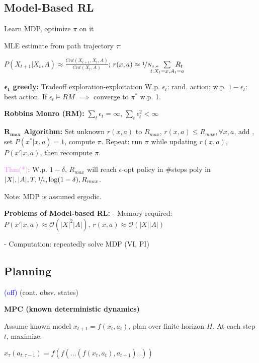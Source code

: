 \subsection*{Model-Based RL} {\fontsize{9.5}{6}\selectfont Learn MDP, optimize $\pi$ on it}

MLE estimate from path trajectory $\tau$:

{\fontsize{9.7}{6}\selectfont $P(X_{t+1} | X_t, A) \approx \frac{Cnt(X_{t+1}, X_t, A)}{Cnt(X_t, A)}$;
$r(x,a) \approx \nicefrac{1}{N_{x,a}} \hspace*{-5mm} \sum\limits_{t: X_t = x, A_t = a} \hspace*{-5mm} R_t$}

\textbf{$\mathbf{\epsilon_t}$ greedy:} Tradeoff exploration-exploitation
W.p. $\epsilon_t$: rand. action; w.p. $1 - \epsilon_t$: best action.
If $\epsilon_t \vDash RM$ $\implies$ converge to $\pi^*$ w.p. 1.

\textbf{Robbins Monro (RM):} $\sum_t \epsilon_t = \infty$, $\sum_t \epsilon_t^2 < \infty$

\textbf{$\mathbf{R_{max}}$ Algorithm:} Set unknown $r(x,a)$ to $R_{max}$, $r(x,a) \leq R_{max}, \forall x,a$, add , set $P(x^* | x,a) = 1$, compute $\pi$. Repeat: run $\pi$ while updating $r(x,a)$, $P(x' | x,a)$, then recompute $\pi$.

\textcolor{violet}{Thm(*)}: W.p. $1 - \delta$, $R_{max}$ will reach $\epsilon$-opt policy in \#steps poly in $|X|, |A|, T, \nicefrac{1}{\epsilon}, \log(1 - \delta), R_{max}$.

Note: MDP is assumed ergodic.

\textbf{Problems of Model-based RL:} - Memory required: $P(x'|x,a) \approx \mathcal{O}(|X|^2 |A|)$, $r(x,a) \approx \mathcal{O}(|X||A|)$

- Computation: repeatedly solve MDP (VI, PI)


\subsection*{Planning} \textcolor{blue}{(off)} (cont. obsv. states)

\textbf{MPC (known deterministic dynamics)}

Assume known model $x_{t+1} = f(x_t, a_t)$, plan over finite horizon $H$. At each step $t$, maximize:


$x_\tau(a_{t:\tau-1}) = f(f(...(f(x_t, a_t), a_{t+1})..))$

